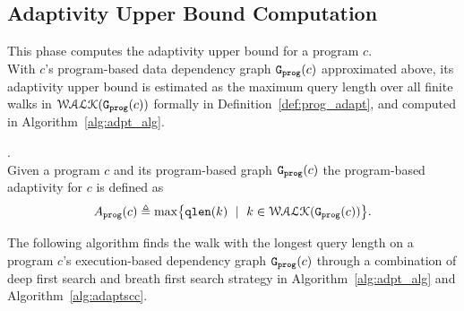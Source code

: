 \subsection{Adaptivity Upper Bound Computation}
\label{sec:alg_adaptcompute}
This phase computes the adaptivity upper bound for a program $c$.
\\
With
$c$'s program-based data dependency graph $\mathtt{{G_{prog}}}({c})$ approximated above,
%
its adaptivity upper bound 
%
is estimated as
the maximum query length over all finite walks in $\mathcal{WALK}(\mathtt{{G_{prog}}}({c}))$ formally in Definition~\ref{def:prog_adapt}, 
and computed 
in Algorithm~\ref{alg:adpt_alg}.
%
%
%
\begin{defn}
.
\label{def:prog_adapt}
\\
{
Given a program ${c}$ and its program-based graph 
$\mathtt{{G_{prog}}}({c})$
%
the program-based adaptivity for $c$ is defined as%
\[
\progA({c}) 
\triangleq \max
\left\{ \qlen(k)\ \mid \  k\in \walks(\progG({c}))\right \}.
\]
}
\end{defn} 

The following algorithm finds the walk with the longest query length on a program $c$'s execution-based dependency graph 
$\mathtt{{G_{prog}}}(c)$
through a combination of 
deep first search and breath first search strategy
in Algorithm~\ref{alg:adpt_alg} and Algorithm~\ref{alg:adaptscc}.

